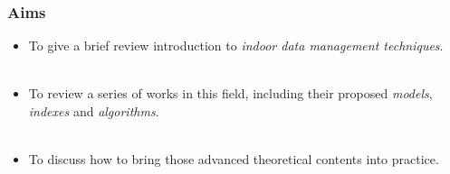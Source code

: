 \begin{frame}
\frametitle{Aims}
\begin{itemize}
\item To give a brief review introduction to \emph{indoor data management techniques}.
\\~\\
\item To review a series of works in this field, including their proposed \emph{models}, \emph{indexes} and \emph{algorithms}.
\\~\\
\item To discuss how to bring those advanced theoretical contents into practice.
\end{itemize}
\end{frame}
